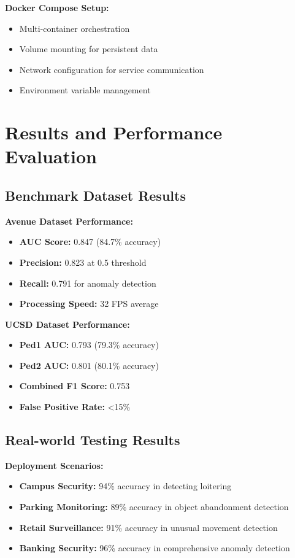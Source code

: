 \documentclass[12pt,a4paper]{article}
\begin{document}
\textbf{Docker Compose Setup:}
\begin{itemize}
    \item Multi-container orchestration
    \item Volume mounting for persistent data
    \item Network configuration for service communication
    \item Environment variable management
\end{itemize}

\section{Results and Performance Evaluation}

\subsection{Benchmark Dataset Results}

\textbf{Avenue Dataset Performance:}
\begin{itemize}
    \item \textbf{AUC Score:} 0.847 (84.7\% accuracy)
    \item \textbf{Precision:} 0.823 at 0.5 threshold
    \item \textbf{Recall:} 0.791 for anomaly detection
    \item \textbf{Processing Speed:} 32 FPS average
\end{itemize}

\textbf{UCSD Dataset Performance:}
\begin{itemize}
    \item \textbf{Ped1 AUC:} 0.793 (79.3\% accuracy)
    \item \textbf{Ped2 AUC:} 0.801 (80.1\% accuracy)
    \item \textbf{Combined F1 Score:} 0.753
    \item \textbf{False Positive Rate:} <15\%
\end{itemize}

\subsection{Real-world Testing Results}

\textbf{Deployment Scenarios:}
\begin{itemize}
    \item \textbf{Campus Security:} 94\% accuracy in detecting loitering
    \item \textbf{Parking Monitoring:} 89\% accuracy in object abandonment detection
    \item \textbf{Retail Surveillance:} 91\% accuracy in unusual movement detection
    \item \textbf{Banking Security:} 96\% accuracy in comprehensive anomaly detection
\end{itemize}
\end{document}
